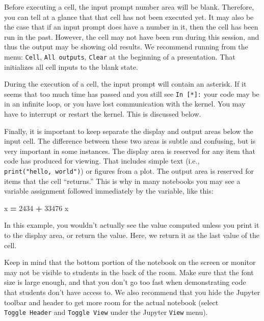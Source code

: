 \documentclass[]{book}
\newenvironment{Shaded}{\begin{snugshade}}{\end{snugshade}}
\newcommand{\DecValTok}[1]{\textcolor[rgb]{0.00,0.00,0.81}{#1}}
\newcommand{\OperatorTok}[1]{\textcolor[rgb]{0.81,0.36,0.00}{\textbf{#1}}}
\newcommand{\NormalTok}[1]{#1}
\let\BeginKnitrBlock\begin \let\EndKnitrBlock\end
\begin{document}
Before executing a cell, the input prompt number area will be blank.
Therefore, you can tell at a glance that that cell has not been executed
yet. It may also be the case that if an input prompt does have a number
in it, then the cell has been run in the past. However, the cell may not
have been run during this session, and thus the output may be showing
old results. We recommend running from the menu: \texttt{Cell},
\texttt{All\ outputs}, \texttt{Clear} at the beginning of a
presentation. That initializes all cell inputs to the blank state.

During the execution of a cell, the input prompt will contain an
asterisk. If it seems that too much time has passed and you still see
\texttt{In\ {[}*{]}:} your code may be in an infinite loop, or you have
lost communication with the kernel. You may have to interrupt or restart
the kernel. This is discussed below.

Finally, it is important to keep separate the display and output areas
below the input cell. The difference between these two areas is subtle
and confusing, but is very important in some instances. The display area
is reserved for any item that code has produced for viewing. That
includes simple text (i.e., \texttt{print("hello,\ world")}) or figures
from a plot. The output area is reserved for items that the cell
``returns.'' This is why in many notebooks you may see a variable
assignment followed immediately by the variable, like this:

\begin{Shaded}
\begin{Highlighting}[]
\NormalTok{x }\OperatorTok{=} \DecValTok{2434} \OperatorTok{+} \DecValTok{33476}
\NormalTok{x}
\end{Highlighting}
\end{Shaded}

In this example, you wouldn't actually see the value computed unless you
print it to the display area, or return the value. Here, we return it as
the last value of the cell.

\BeginKnitrBlock{rmdimportant}
Keep in mind that the bottom portion of the notebook on the screen or
monitor may not be visible to students in the back of the room. Make
sure that the font size is large enough, and that you don't go too fast
when demonstrating code that students don't have access to. We also
recommend that you hide the Jupyter toolbar and header to get more room
for the actual notebook (select \texttt{Toggle\ Header} and
\texttt{Toggle\ View} under the Jupyter \texttt{View} menu).
\EndKnitrBlock{rmdimportant}
\end{document}
